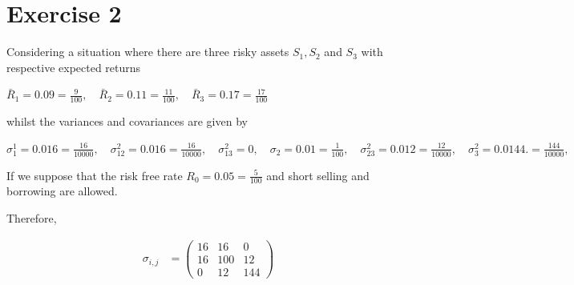 \documentclass[12pt,a4paper]{article}
\begin{document}
	\section*{Exercise 2}
			Considering a situation where there are three risky assets $S_1, S_2$ and $S_3$ with respective expected returns
			\begin{spacing}{1.125}
					$\bar{R}_1  =  0.09  =  \frac{9}{100},	\quad \bar{R}_2  =  0.11  = \frac{11}{100}, \quad \bar{R}_3  =  0.17  = \frac{17}{100}$
			\end{spacing}
			whilst the variances and covariances are given by
			\begin{spacing}{2.125}
  		  	$
				\sigma^1_1  =  0.016  = \frac{16}{10000}, \quad \sigma_{12}^2 = 				0.016  = \frac{16}{10000},  \quad \sigma_{13}^2 = 0 ,  \quad \sigma_2  =  0.01 =  \frac{1}{100} , \quad \sigma_{23}^2 =  0.012  = \frac{12}{10000},  \quad \sigma_{3}^2 = 				0.0144.  = \frac{144}{10000}, 
		  $
		  \end{spacing}
		  \begin{spacing}{2.125}
		  	If we suppose that the risk free rate $R_0  = 0.05  =  \frac{5}{100}$ and short selling and borrowing are allowed.
		  \end{spacing}
		  		  \begin{spacing}{2.125}
		  		Therefore,
		  \end{spacing}
		  \begin{align*}
		  			\sigma_{i,j}  &=  \begin{pmatrix}
		  					16 & 16 & 0 \\
		  					16 & 100 & 12\\
		  					0 & 12 & 144
		  		\end{pmatrix}\\
		  \end{align*}
\end{document}
